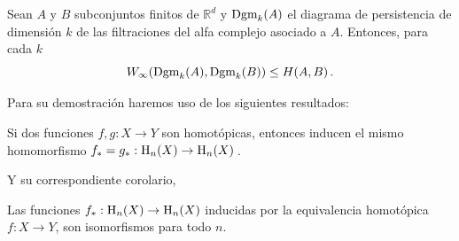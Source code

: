 \begin{theorem}\label{th:estabilidadAlfa}
Sean $A$ y $B$ subconjuntos finitos de $\mathbb{R}^d$ y $\text{\rm Dgm}_k(A)$ el diagrama de persistencia de dimensión $k$ de las filtraciones del alfa complejo asociado a $A$. Entonces, para cada $k$
\[
W_\infty(\text{\rm Dgm}_k(A), \text{\rm Dgm}_k(B)) \leq H(A, B)\,.
\]
\end{theorem}

Para su demostración haremos uso de los siguientes resultados:

\begin{theorem}
\begin{sloppypar}
Si dos funciones $f, g: X \to Y$ son homotópicas, entonces inducen el mismo homomorfismo  ${f_*=g_*:\text{\rm H}_n(X) \to \text{\rm H}_n(X)}\,$.
\end{sloppypar}
\end{theorem}
Y su correspondiente corolario,
\begin{corollary}\label{cor:homotopia}
Las funciones $f_*:\text{\rm H}_n(X) \to \text{\rm H}_n(X)$ inducidas por la equivalencia homotópica $f:X \to Y$, son isomorfismos para todo $n$.
\end{corollary}

